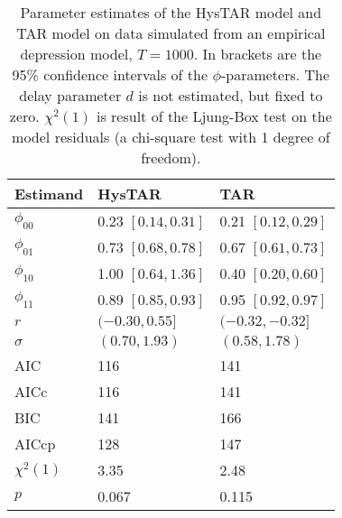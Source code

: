 \begin{table}[h!]
\begin{center}
\begin{tabular}{ l l l }
\hline
Estimand & HysTAR & TAR \\ \hline
$\phi_{00}$ 	& 0.23 $[0.14, 0.31]$ 	& 0.21 $[0.12, 0.29]$ 	\\
$\phi_{01}$ 	& 0.73 $[0.68, 0.78]$ 	& 0.67 $[0.61, 0.73]$ 	\\
$\phi_{10}$ 	& 1.00 $[0.64, 1.36]$ 	& 0.40 $[0.20, 0.60]$ 	\\
$\phi_{11}$ 	& 0.89 $[0.85, 0.93]$ 	& 0.95 $[0.92, 0.97]$ 	\\
$r$ 			& $(-0.30, 0.55]$ 		& $(-0.32, -0.32]$  		\\
$\sigma$ 	& $(0.70, 1.93)$ 		& $(0.58, 1.78)$  		\\ \hline
AIC  		& 116 					&  141  					\\
AICc 		& 116 					&  141 					\\
BIC  		& 141 					& 166  					\\
AICcp 		& 128 					& 147 					\\ \hline
$\chi^2(1)$ 	& 3.35 					& 2.48 		 			\\
$p$ 			& 0.067 					& 0.115 					\\
\hline
\end{tabular}
\caption{Parameter estimates of the HysTAR model and TAR model on data simulated from an empirical depression model, $T = 1000$. In brackets are the 95\% confidence intervals of the $\phi$-parameters. The delay parameter $d$ is not estimated, but fixed to zero. $\chi^2(1)$ is result of the Ljung-Box test on the model residuals (a chi-square test with 1 degree of freedom).}
\label{tab:results_MD}
\end{center}
\end{table}